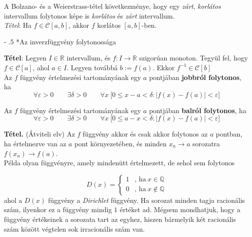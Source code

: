 \documentclass[tikz,12pt,margin=0px]{article}
\makeatletter
\renewcommand\paragraph{%
	\@startsection{paragraph}{4}{0mm}%
	{-\baselineskip}%
	{.5\baselineskip}%
	{\normalfont\normalsize\bfseries}}
\makeatother
\begin{document}
    \noindent A Bolzano- és a Weierstrass-tétel következménye, hogy egy \emph{zárt}, \emph{korlátos} intervallum folytonos képe is \emph{korlátos} és \emph{zárt} intervallum.\\

    \noindent \emph{Tétel}: Ha $f \in \mathcal{C}[a,b]$, akkor $f$ korlátos $[a,b]$-ben.

    \paragraph*{Az inverzfüggvény folytonossága}

    \noindent \textbf{Tétel}: Legyen $I \in \mathbb{R}$ intervallum, és $f : I \to \mathbb{R}$ szigorúan monoton. Tegyül fel, hogy $f \in \mathcal{C}[a]$, ahol $a \in I$. Legyen továbbá $b := f(a)$. Ekkor $f^{-1} \in \mathcal{C}[b]$\\

    \noindent Az $f$ függvény értelmezési tartományának egy $a$ pontjában \textbf{jobbról folytonos}, ha
    \[
        \forall \varepsilon > 0\qquad \exists \delta > 0\qquad \forall x \ \Big[0 \leq x - a < \delta : \big|f(x) - f(a)\big| < \varepsilon\Big]
    \]

    \noindent Az $f$ függvény értelmezési tartományának egy $a$ pontjában \textbf{balról folytonos}, ha
    \[
        \forall \varepsilon > 0\qquad \exists \delta > 0\qquad \forall x \ \Big[0 \leq a - x < \delta : \big|f(x) - f(a)\big| < \varepsilon\Big]
    \]

    \noindent \textbf{Tétel.} (Átviteli elv) Az $f$ függvény akkor és csak akkor folytonos az $a$ pontban, ha értelmezve van az $a$ pont környezetében, és minden $x_{n} \to a$ sorozatra $f(x_{n}) \to f(a)$.\\

    \noindent Példa olyan függvényre, amely mindenütt értelmezett, de sehol sem folytonos

    \[
        D(x)= \left\{ \begin{array}{rl}
                        1 & \text{, ha}\ x \in \mathbb{Q} \\
                        0 & \text{, ha}\ x \not \in \mathbb{Q}
                      \end{array}
         \right.
    \]
    ahol a $D(x)$ függvény a \emph{Dirichlet} függvény. Ha sorozat minden tagja racionális szám, ilyenkor ez a függvény mindig $1$ értéket ad. Mégsem mondhatjuk, hogy a függvény értékeinek a sorozata tart az egyhez, hiszen bármelyik két racionális szám között végtelen sok irracionális szám van.\\
\end{document}
